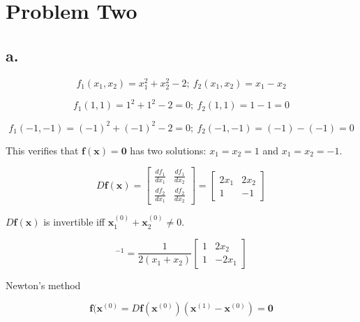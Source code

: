 \documentclass[00-main.tex]{subfiles}
\begin{document}
\section*{Problem Two}

\subsection*{a.}
\begin{equation}
f_1(x_1, x_2) = x_1^2 + x_2^2 - 2; \: f_2(x_1, x_2) = x_1 - x_2
\end{equation}

\begin{equation}
f_1(1, 1) = 1^2 + 1^2 - 2 = 0; \: f_2(1, 1) = 1 - 1 = 0
\end{equation}

\begin{equation}
f_1(-1, -1) = (-1)^2 + (-1)^2 - 2 = 0; \: f_2(-1, -1) = (-1) - (-1) = 0
\end{equation}

This verifies that $\mathbf{f}(\mathbf{x}) = \mathbf{0}$ has two solutions: $x_1 = x_2 = 1$ and $x_1 = x_2 = -1$.

\begin{equation}
D\mathbf{f}(\mathbf{x})
=
\left[ 	
	\begin{array}{cc} 
		\frac{df_1}{dx_1} & \frac{df_1}{dx_2} \\ 
		\frac{df_2}{dx_1} & \frac{df_2}{dx_2}  
	\end{array} 
\right]
=
\left[ 	
	\begin{array}{cc} 
		2x_1 & 2x_2 \\ 
		1    & -1  
	\end{array} 
\right] 
\end{equation}

$D\mathbf{f}(\mathbf{x})$ is invertible iff $\mathbf{x}_1^{(0)} + \mathbf{x}_2^{(0)} \neq 0$.

\begin{equation}
[D\mathbf{f}(\mathbf{x})]^{-1}
=
\frac{1}{2(x_1+x_2)} 
\left[ 	
	\begin{array}{cc} 
		1 & 2x_2 \\ 
		1 & -2x_1  
	\end{array} 
\right] 
\end{equation}

Newton's method

\begin{equation}
\mathbf{f} (\mathbf{x}^{(0)} = D \mathbf{f} (\mathbf{x}^{(0)})(\mathbf{x}^{(1)} - \mathbf{x}^{(0)}) = \mathbf{0}
\end{equation}
\end{document}
